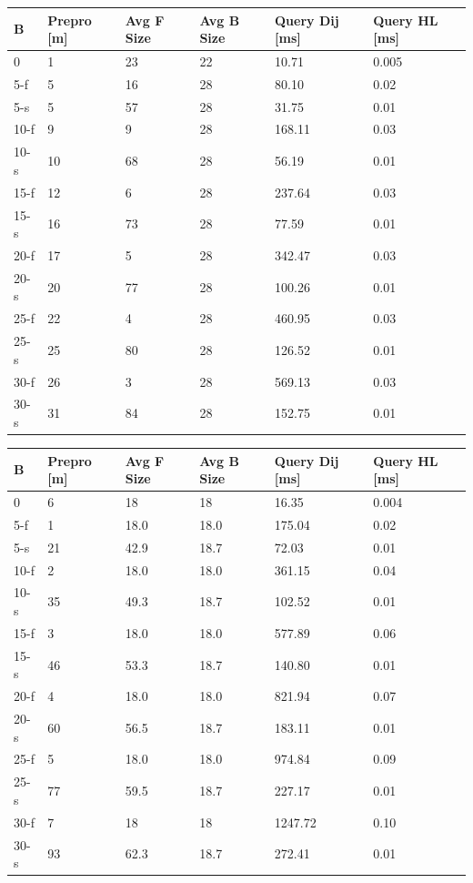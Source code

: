 \begin{table}

\begin{adjustbox}{max width=\textwidth,keepaspectratio}
\begin{tabular}{| l | p{1cm} | p{1cm} | p{1cm} | p{1.2cm} | p{1.2cm} | }
\hline
	B & Prepro [m] & Avg F Size & Avg B Size & Query Dij [ms] & Query HL [ms] \\ \hline \hline
	0 & 1 & 23 & 22 & 10.71 & 0.005 \\ \hline
5-f  & 5  & 16 & 28 & 80.10  & 0.02 \\
5-s  & 5  & 57 & 28 & 31.75  & 0.01 \\ \hline
10-f & 9  & 9 & 28 & 168.11 & 0.03 \\
10-s & 10 & 68 & 28 & 56.19  & 0.01 \\ \hline
15-f & 12 & 6 & 28 & 237.64 & 0.03 \\
15-s & 16 & 73 & 28 & 77.59  & 0.01 \\ \hline
20-f & 17 & 5 & 28 & 342.47 & 0.03 \\
20-s & 20 & 77 & 28 & 100.26 & 0.01 \\ \hline
25-f & 22 & 4 & 28 & 460.95 & 0.03 \\
25-s & 25 & 80 & 28 & 126.52 & 0.01 \\ \hline
30-f & 26 & 3 & 28 & 569.13 & 0.03 \\
30-s & 31 & 84 & 28 & 152.75 & 0.01 \\ \hline
\end{tabular}%
\quad
\begin{tabular}{ | l | p{1cm} | p{1cm} | p{1cm} | p{1.2cm} | p{1.2cm} |}
\hline
	B & Prepro  [m] & Avg F Size & Avg B Size & Query Dij [ms] & Query HL [ms] \\ \hline \hline
	0 & 6 & 18 & 18 & 16.35 & 0.004 \\ \hline
5-f  & 1  & 18.0 & 18.0 & 175.04  & 0.02 \\
5-s  & 21 & 42.9 & 18.7 & 72.03   & 0.01 \\ \hline
10-f & 2  & 18.0 & 18.0 & 361.15  & 0.04 \\
10-s & 35 & 49.3 & 18.7 & 102.52  & 0.01 \\ \hline
15-f & 3  & 18.0 & 18.0 & 577.89  & 0.06 \\
15-s & 46 & 53.3 & 18.7 & 140.80  & 0.01 \\ \hline
20-f & 4  & 18.0 & 18.0 & 821.94  & 0.07 \\
20-s & 60 & 56.5 & 18.7 & 183.11  & 0.01 \\ \hline
25-f & 5  & 18.0 & 18.0 & 974.84  & 0.09 \\
25-s & 77 & 59.5 & 18.7 & 227.17  & 0.01 \\ \hline
30-f & 7  & 18   & 18   & 1247.72 & 0.10 \\
30-s & 93 & 62.3 & 18.7 & 272.41  & 0.01 \\ \hline
\end{tabular}%
\end{adjustbox}


\end{table}
